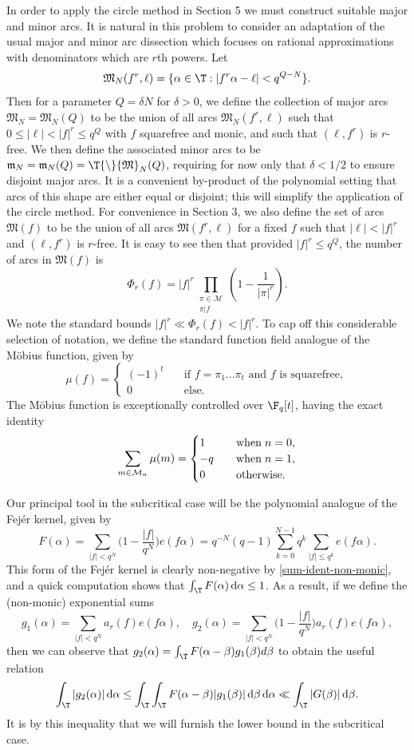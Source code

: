 \documentclass[reqno,11pt]{amsart}
\theoremstyle{definition}
\theoremstyle{remark}
\numberwithin{equation}{section}
\def\calM{{\mathcal M}}
\def\setmin{{\setminus\!\,}}
\def\grm{{\mathfrak m}}\def\grM{{\mathfrak M}}\def\grN{{\mathfrak N}}
\renewcommand{\d}{\,{\rm d}} %
\newcommand{\<}{\begin{equation}}
\renewcommand{\>}{\end{equation}}
\begin{document}
In order to apply the circle method in Section 5 we must construct suitable major and minor arcs. It is natural in this problem to consider an adaptation of the usual major and minor arc dissection which focuses on rational approximations with denominators which are $r$th powers. Let
\[\grM_N(f^r,\ell) = \{\alpha \in \T: |f^r\alpha - \ell|<q^{Q-N}\}.\]
Then for a parameter $Q = \delta N$ for $\delta>0$, we define the collection of major arcs $\grM_N = \grM_N(Q)$ to be the union of all arcs $\grM_N(f^r,\ell)$ such that $0 \leq |\ell|<|f|^r \leq q^Q$ with $f$ squarefree and monic, and such that $(\ell,f^r)$ is $r$-free. We then define the associated minor arcs to be $\grm_N = \grm_N(Q) = \T \setmin \grM_N(Q)$, requiring for now only that $\delta <1/2$ to ensure disjoint major arcs. It is a convenient by-product of the polynomial setting that arcs of this shape are either equal or disjoint; this will simplify the application of the circle method. For convenience in Section 3, we also define the set of arcs $\grM(f)$ to be the union of all arcs $\grM(f^r,\ell)$ for a fixed $f$ such that $|\ell|<|f|^r$ and $(\ell,f^r)$ is $r$-free. It is easy to see then that provided $|f|^r\leq q^Q$, the number of arcs in $\grM(f)$ is
\<\label{Phi_r}
\Phi_r(f) = |f|^r \prod_{\substack{\pi \in \calM \\ \pi|f}} \left(1 - \dfrac{1}{|\pi|^r}\right).
\>
We note the standard bounds $|f|^r \ll \Phi_r(f) < |f|^r$. To cap off this considerable selection of notation, we define the standard function field analogue of the M\"obius function, given by
\[\mu(f) = \begin{cases}
    (-1)^t \quad &\text{if } f = \pi_1...\pi_t \text{ and } f \text{ is squarefree}, \\
    0 \quad &\text{else.}
\end{cases}\]
The M\"obius function is exceptionally controlled over $\F_q[t]$, having the exact identity
\<\label{mobius}
\sum_{m \in \calM_n} \mu(m) = \begin{cases}
    1 \quad &{\rm when } \;n = 0,\\
    -q \quad &{\rm when } \;n = 1, \\
    0 \quad &{\rm otherwise}.
\end{cases}
\>

Our principal tool in the subcritical case will be the polynomial analogue of the Fej\'er kernel, given by
\<\label{Fejer}
F(\alpha) = \sum_{|f| < q^N} \bigg(1-\dfrac{|f|}{q^N}\bigg)e(f\alpha) = q^{-N}(q-1)\sum_{k=0}^{N-1} q^k\sum_{|f| \leq q^k} e(f\alpha).
\>
This form of the Fej\'er kernel is clearly non-negative by \eqref{sum-ident-non-monic}, and a quick computation shows that $\int_\T F(\alpha)\d\alpha \leq 1$. As a result, if we define the (non-monic) exponential sums
\<\label{g_1-g_2} 
g_1(\alpha) = \sum_{|f| < q^N} a_r(f)e(f\alpha),\quad g_2(\alpha) = \sum_{|f| < q^N} \bigg(1-\dfrac{|f|}{q^N}\bigg) a_r(f) e(f\alpha),
\>
then we can observe that $g_2(\alpha) = \int_\T F(\alpha-\beta)g_1(\beta)d\beta$ to obtain the useful relation
\<\label{g_2}
\int_\T |g_2(\alpha)|\d\alpha \leq \int_\T \int_\T F(\alpha-\beta)|g_1(\beta)|\d\beta \d\alpha \ll \int_\T |G(\beta)| \d\beta.
\>
It is by this inequality that we will furnish the lower bound in the subcritical case.
\end{document}
